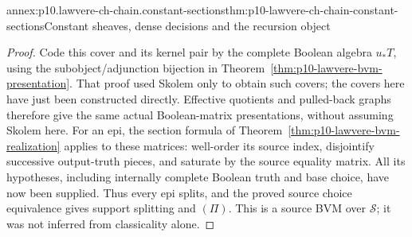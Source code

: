 \begin{annexitem}{annex:p10.lawvere-ch-chain.constant-sections}{thm:p10-lawvere-ch-chain-constant-sections}{Constant sheaves, dense decisions and the recursion object}
\begin{proof}
Code this cover and its kernel pair by the complete Boolean algebra
\(u_*T\), using the subobject/adjunction bijection in
Theorem~\ref{thm:p10-lawvere-bvm-presentation}. That proof used Skolem
only to obtain such covers; the covers here have just been constructed
directly. Effective quotients and pulled-back graphs therefore give the
same actual Boolean-matrix presentations, without assuming Skolem here.
For an epi, the section formula of
Theorem~\ref{thm:p10-lawvere-bvm-realization} applies to these matrices:
well-order its source index, disjointify successive output-truth pieces,
and saturate by the source equality matrix. All its hypotheses, including
internally complete Boolean truth and base choice, have now been supplied.
Thus every epi splits, and the proved source choice equivalence gives
support splitting and \((\Pi)\). This is a source BVM over \(\mathcal S\);
it was not inferred from classicality alone.
\end{proof}
\end{annexitem}

